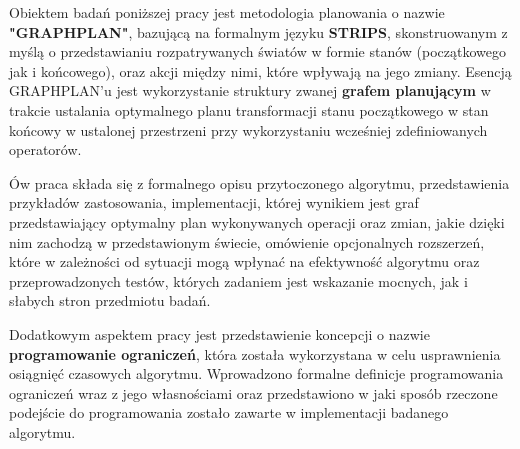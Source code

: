 \begin{streszczenie}
    Obiektem badań poniższej pracy jest metodologia planowania
    o nazwie \textbf{"GRAPHPLAN"}, bazującą na formalnym języku \textbf{STRIPS}, skonstruowanym z myślą o przedstawianiu 
    rozpatrywanych światów w formie stanów (początkowego jak i końcowego), 
    oraz akcji między nimi, które wpływają na jego zmiany.
    Esencją GRAPHPLAN'u jest wykorzystanie
    struktury zwanej \textbf{grafem planującym} w trakcie ustalania optymalnego planu transformacji
    stanu początkowego w stan końcowy w ustalonej przestrzeni przy wykorzystaniu wcześniej zdefiniowanych
    operatorów. 

    Ów praca składa się z formalnego opisu przytoczonego algorytmu, przedstawienia przykładów zastosowania,
    implementacji, której wynikiem jest graf przedstawiający optymalny plan wykonywanych operacji oraz zmian, jakie dzięki nim zachodzą w 
    przedstawionym świecie, omówienie opcjonalnych rozszerzeń, które w zależności od sytuacji mogą wpłynać na efektywność algorytmu
    oraz przeprowadzonych testów, których zadaniem jest wskazanie mocnych, jak i słabych stron przedmiotu badań. 

    Dodatkowym aspektem pracy jest przedstawienie koncepcji o nazwie \textbf{programowanie ograniczeń}, 
    która została wykorzystana w celu usprawnienia osiągnięć czasowych algorytmu. 
    Wprowadzono formalne definicje programowania ograniczeń wraz z jego własnościami oraz przedstawiono w jaki sposób rzeczone podejście do 
    programowania zostało zawarte w implementacji badanego algorytmu.

\end{streszczenie}
